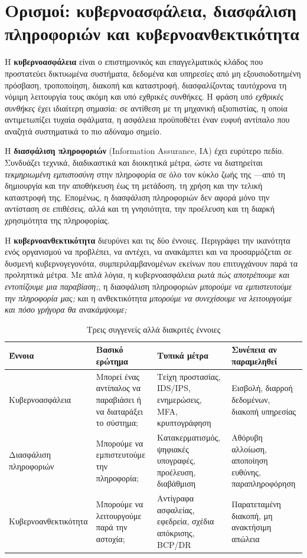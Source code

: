 \section{Ορισμοί: κυβερνοασφάλεια, διασφάλιση πληροφοριών και κυβερνοανθεκτικότητα}\label{sec:1.1}
Η \textbf{κυβερνοασφάλεια} είναι ο επιστημονικός και επαγγελματικός κλάδος που προστατεύει δικτυωμένα συστήματα, δεδομένα και υπηρεσίες από μη εξουσιοδοτημένη πρόσβαση, τροποποίηση, διακοπή και καταστροφή, διασφαλίζοντας ταυτόχρονα τη νόμιμη λειτουργία τους ακόμη και υπό εχθρικές συνθήκες. Η φράση \emph{υπό εχθρικές συνθήκες} έχει ιδιαίτερη σημασία: σε αντίθεση με τη μηχανική αξιοπιστίας, η οποία αντιμετωπίζει τυχαία σφάλματα, η ασφάλεια προϋποθέτει έναν ευφυή αντίπαλο που αναζητά συστηματικά το πιο αδύναμο σημείο.

Η \textbf{διασφάλιση πληροφοριών} (Information Assurance, IA) έχει ευρύτερο πεδίο. Συνδυάζει τεχνικά, διαδικαστικά και διοικητικά μέτρα, ώστε να διατηρείται \emph{τεκμηριωμένη εμπιστοσύνη} στην πληροφορία σε όλο τον κύκλο ζωής της —από τη δημιουργία και την αποθήκευση έως τη μετάδοση, τη χρήση και την τελική καταστροφή της. Επομένως, η διασφάλιση πληροφοριών δεν αφορά μόνο την αντίσταση σε επιθέσεις, αλλά και τη γνησιότητα, την προέλευση και τη διαρκή χρησιμότητα της πληροφορίας.

Η \textbf{κυβερνοανθεκτικότητα} διευρύνει και τις δύο έννοιες. Περιγράφει την ικανότητα ενός οργανισμού να προβλέπει, να αντέχει, να ανακάμπτει και να προσαρμόζεται σε δυσμενή κυβερνογεγονότα, συμπεριλαμβανομένων εκείνων που επιτυγχάνουν παρά τα προληπτικά μέτρα. Με απλά λόγια, η κυβερνοασφάλεια ρωτά \emph{πώς αποτρέπουμε και εντοπίζουμε μια παραβίαση;}, η διασφάλιση πληροφοριών \emph{μπορούμε να εμπιστευτούμε την πληροφορία μας;} και η ανθεκτικότητα \emph{μπορούμε να συνεχίσουμε να λειτουργούμε και πόσο γρήγορα θα ανακάμψουμε;}

\begin{table}[htbp]
  \centering\small
  \caption{Τρεις συγγενείς αλλά διακριτές έννοιες}
  \begin{tabularx}{\linewidth}{>{\raggedright\arraybackslash}X >{\raggedright\arraybackslash}X >{\raggedright\arraybackslash}X >{\raggedright\arraybackslash}X}
    \toprule
    \textbf{Έννοια} & \textbf{Βασικό ερώτημα} & \textbf{Τυπικά μέτρα} & \textbf{Συνέπεια αν παραμεληθεί} \\
    \midrule
    Κυβερνοασφάλεια & Μπορεί ένας αντίπαλος να παραβιάσει ή να διαταράξει το σύστημα; & Τείχη προστασίας, IDS/IPS, ενημερώσεις, MFA, κρυπτογράφηση & Εισβολή, διαρροή δεδομένων, διακοπή υπηρεσίας \\
    Διασφάλιση πληροφοριών & Μπορούμε να εμπιστευτούμε την πληροφορία; & Κατακερματισμός, ψηφιακές υπογραφές, προέλευση, διαβάθμιση & Αθόρυβη αλλοίωση, αποποίηση ευθύνης, παραπληροφόρηση \\
    Κυβερνοανθεκτικότητα & Μπορούμε να λειτουργούμε παρά την αστοχία; & Αντίγραφα ασφαλείας, εφεδρεία, σχέδια απόκρισης, BCP/DR & Παρατεταμένη διακοπή, μη ανακτήσιμη απώλεια \\
    \bottomrule
  \end{tabularx}
\end{table}
